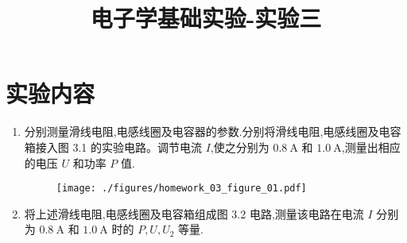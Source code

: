 
\usepackage{../../homeworks_preamble}
\title{电子学基础实验-实验三}


    \maketitle
    \section{实验内容}
    \begin{enumerate}
        \item 分别测量滑线电阻,电感线圈及电容器的参数.分别将滑线电阻,电感线圈及电容箱接入图 3.1 的实验电路。调节电流 $I$,使之分别为 $0.8 \ \mathrm{A}$ 和 $1.0 \ \mathrm{A}$,测量出相应的电压 $U$ 和功率 $P$ 值.
            \begin{figure}[htbp]
                \centering
                \texttt{[image: ./figures/homework\_03\_figure\_01.pdf]}
            \end{figure}
        \item 将上述滑线电阻,电感线圈及电容箱组成图 3.2 电路,测量该电路在电流 $I$ 分别为 $0.8 \ \mathrm{A}$ 和 $1.0 \ \mathrm{A}$ 时的 $P,U,U_2$ 等量.
    \end{enumerate}
    \newpage

